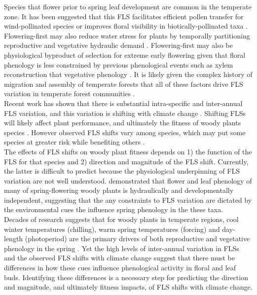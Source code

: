 \documentclass[11pt]{article}
\begin{document}
\noindent Species that flower prior to spring leaf development are common in the temperate zone. It has been suggested that this FLS facilitates efficient pollen transfer for wind-pollinated species \citep{Rathcke_1985} or improves floral visibility in biotically-pollinated taxa \citep{Janzen1967}. Flowering-first may also reduce water stress for plants by temporally partitioning reproductive and vegetative hydraulic demand \citep{Gougherty2018,Reich1984}. Flowering-first may also be physiological byproduct of selection for extreme early flowering given that floral phenology is less constrained by previous phenological events such as xylem reconstruction that vegetative phenology \citep{Primack1987,Savage2019}. It is likely given the complex history of migration and assembly of temperate forests that all of these factors drive FLS variation in temperate forest communities \citep{Buonaiuto2020}.\\

\noindent Recent work has shown that there is substantial intra-specific and inter-annual FLS variation, and this variation is shifting with climate change \citep{Buonaiuto2020}. Shifting FLSs will likely affect plant performance, and ultimately the fitness of woody plants species \citep{Savage2019}. However observed FLS shifts vary among species, which may put some species at greater risk while benefiting others \citep{Buonaiuto2020}.\\ 

\noindent The effects of FLS shifts on woody plant fitness depends on 1) the function of the FLS for that species and 2) direction and magnitude of the FLS shift. Currently, the latter is difficult to predict because the physiological underpinning of FLS variation are not well understood. \citet{Savage2019} demonstrated that flower and leaf phenology of many of spring-flowering woody plants is hydraulically and developmentally independent, suggesting that the any constraints to FLS variation are dictated by the environmental cues the influence spring phenology in the these taxa.\\

\noindent Decades of research suggests that for woody plants in temperate regions, cool winter temperatures (chilling), warm spring temperatures (forcing) and day-length (photoperiod) are the primary drivers of both reproductive and vegetative phenology in the spring \citep{Forrest2018,Flynn2018}. Yet the high levels of inter-annual variation in FLSs and the observed FLS shifts with climate change suggest that there must be differences in how these cues influence phenological activity in floral and leaf buds. Identifying these differences is a necessary step for predicting the direction and magnitude, and ultimately fitness impacts, of FLS shifts with climate change. \\
\end{document}
